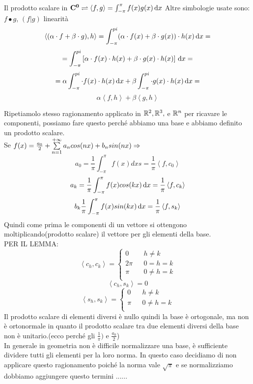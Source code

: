 Il prodotto scalare in $\mathbf{C^{0}} \rightleftharpoons \left<f,g\right>=\int_{-\pi}^{\pi}f(x)g(x)\,\mathrm{d}{x}$
Altre simbologie usate sono: $ f\bullet g $, $(f|g)$
\observation linearità\\
$$\left<(\alpha\cdot f+\beta\cdot g), h \right>= \int_{-\pi}^{pi} (\alpha\cdot f(x)+\beta\cdot g(x))\cdot h(x) \,\mathrm{d}{x}=$$
$$=\int_{-\pi}^{pi} \left[\alpha\cdot f(x)\cdot h(x)+\beta\cdot g(x)\cdot h(x) \right]\,\mathrm{d}{x}= $$
$$=\alpha\int_{-\pi}^{pi} \cdot f(x)\cdot h(x) \,\mathrm{d}{x}+\beta\int_{-\pi}^{pi} \cdot g(x)\cdot h(x) \,\mathrm{d}{x} =$$
$$\alpha\left<f,h\right>+\beta\left<g,h\right>$$

Ripetiamolo stesso ragionamento applicato in $ \mathbb{R}^2, \mathbb{R}^3,$ e $ \mathbb{R}^n$ per ricavare le componenti, possiamo fare questo perché abbiamo una base e abbiamo definito un prodotto scalare.\\
Se $f(x)=\frac{a_0}{2}+\sum\limits_{n=1}^{+\infty}a_{n}cos(nx)+b_{n}sin(nx) \Rightarrow $
$$a_0=\frac{1}{\pi}\int_{-\pi}^{\pi}f(x)dxs=\frac{1}{\pi}\left<f,c_0\right> $$
$$a_k=\frac{1}{\pi}\int_{-\pi}^{\pi}f(x)cos(kx)\,\mathrm{d}{x}=\frac{1}{\pi}\left<f,c_k\right> $$
$$b_k\frac{1}{\pi}\int_{-\pi}^{\pi}f(x)sin(kx)\,\mathrm{d}{x}=\frac{1}{\pi}\left<f,s_k\right>$$
Quindi come prima le componenti di un vettore si ottengono moltiplicando(prodotto scalare) il vettore per gli elementi della base.\\
PER IL LEMMA:\\
$$
\left<c_h,c_k\right>=
\left\{\begin{matrix}
0&&h\ne k\\
2\pi&&0=h=k\\
\pi&&0\ne h=k\\
\end{matrix}\right.
$$
$$ \left<c_h,s_k\right>=0$$
$$
\left<s_h,s_k\right>=
\left\{\begin{matrix}
0&&h\ne k\\
\pi&&0\ne h=k\\
\end{matrix}\right.
$$
Il prodotto scalare di elementi diversi è nullo quindi la base è ortogonale, ma non è ortonormale in quanto il prodotto scalare tra due elementi diversi della base non è unitario.(ecco perché gli $\frac{1}{\pi})$ e $\frac{a_0}{2}$)\\
In generale in geometria non è difficile normalizzare una base, è sufficiente dividere tutti gli elementi per la loro norma. In questo caso decidiamo di non applicare questo ragionamento poiché la norma vale $\sqrt{\pi}$ e se normalizziamo dobbiamo aggiungere questo termini ......\\
